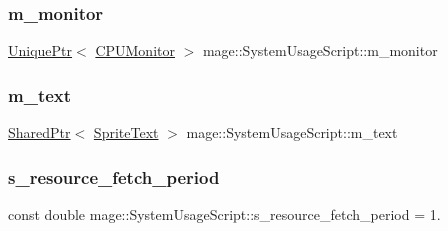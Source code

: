 \subsubsection{\texorpdfstring{m\+\_\+monitor}{m\_monitor}}
{\footnotesize\ttfamily \hyperlink{namespacemage_a8c307fbcc33bce9b7f2aa4c26c3b95cf}{Unique\+Ptr}$<$ \hyperlink{classmage_1_1_c_p_u_monitor}{C\+P\+U\+Monitor} $>$ mage\+::\+System\+Usage\+Script\+::m\+\_\+monitor\hspace{0.3cm}{\ttfamily [private]}}

\hypertarget{classmage_1_1_system_usage_script_af6dd5e39889458ffb042f1d13fbcd7ea}{}\label{classmage_1_1_system_usage_script_af6dd5e39889458ffb042f1d13fbcd7ea} 
\subsubsection{\texorpdfstring{m\+\_\+text}{m\_text}}
{\footnotesize\ttfamily \hyperlink{namespacemage_a1e01ae66713838a7a67d30e44c67703e}{Shared\+Ptr}$<$ \hyperlink{classmage_1_1_sprite_text}{Sprite\+Text} $>$ mage\+::\+System\+Usage\+Script\+::m\+\_\+text\hspace{0.3cm}{\ttfamily [private]}}

\hypertarget{classmage_1_1_system_usage_script_a1c6b08be09a34ebd4515f6c09622afbd}{}\label{classmage_1_1_system_usage_script_a1c6b08be09a34ebd4515f6c09622afbd} 
\subsubsection{\texorpdfstring{s\+\_\+resource\+\_\+fetch\+\_\+period}{s\_resource\_fetch\_period}}
{\footnotesize\ttfamily const double mage\+::\+System\+Usage\+Script\+::s\+\_\+resource\+\_\+fetch\+\_\+period = 1.\hspace{0.3cm}{\ttfamily [static]}}

